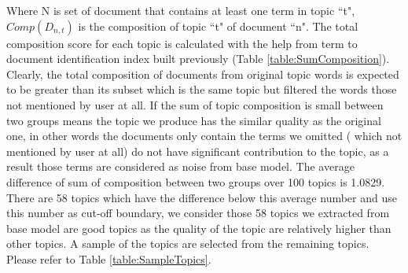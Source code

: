 \documentclass[11pt,twoside]{report}
\begin{document}
Where N is set of document that contains at least one term in topic ``t", $Comp(D_{n,t})$ is the composition of topic ``t" of document ``n". 
The total composition score for each topic is calculated with the help from term to document identification index built previously (Table \ref{table:SumComposition}). Clearly, the total composition of documents from original topic words is expected to be greater than its subset which is the same topic but filtered the words those not mentioned by user at all. If the sum of topic composition is small between two groups means the topic we produce has the similar quality as the original one, in other words the documents only contain the terms we omitted ( which not mentioned by user at all) do not have significant contribution to the topic, as a result those terms are considered as noise from base model.
The average difference of sum of composition between two groups over 100 topics is 1.0829. There are 58 topics which have the difference below this average number and use this number as cut-off boundary, we consider those 58 topics we extracted from base model are good topics as the quality of the topic are relatively higher than other topics. A sample of the topics are selected from the remaining topics. Please refer to Table \ref{table:SampleTopics}.
\end{document}
